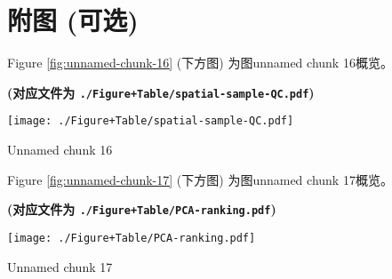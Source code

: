 \documentclass[
]{article}
\begin{document}
\begin{center}\vspace{1.5cm}\end{center}

\hypertarget{ux9644ux56fe-ux53efux9009}{%
\section{附图 (可选)}\label{ux9644ux56fe-ux53efux9009}}

\begin{center}\vspace{1.5cm}\end{center}

Figure \ref{fig:unnamed-chunk-16} (下方图) 为图unnamed chunk 16概览。

\textbf{(对应文件为 \texttt{./Figure+Table/spatial-sample-QC.pdf})}

\def\@captype{figure}
\begin{center}
\texttt{[image: ./Figure+Table/spatial-sample-QC.pdf]}
\caption{Unnamed chunk 16}\label{fig:unnamed-chunk-16}
\end{center}

\begin{center}\vspace{1.5cm}\end{center}

\begin{center}\vspace{1.5cm}\end{center}

Figure \ref{fig:unnamed-chunk-17} (下方图) 为图unnamed chunk 17概览。

\textbf{(对应文件为 \texttt{./Figure+Table/PCA-ranking.pdf})}

\def\@captype{figure}
\begin{center}
\texttt{[image: ./Figure+Table/PCA-ranking.pdf]}
\caption{Unnamed chunk 17}\label{fig:unnamed-chunk-17}
\end{center}

\begin{center}\vspace{1.5cm}\end{center}
\end{document}
